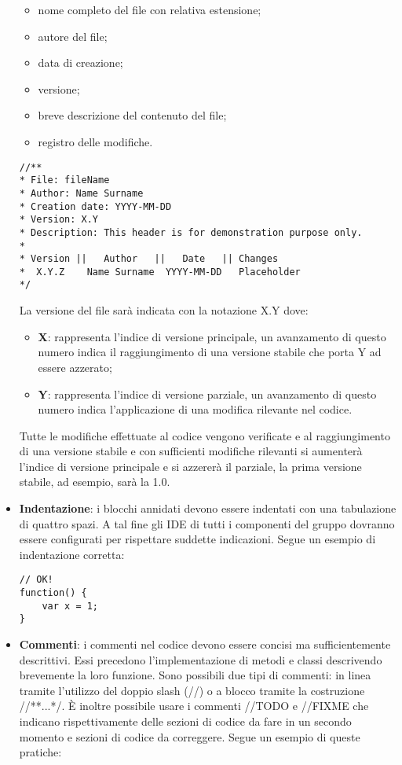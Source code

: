 \begin{itemize}
	\begin{itemize}
		\item nome completo del file con relativa estensione;
		\item autore del file;
		\item data di creazione;
		\item versione;
		\item breve descrizione del contenuto del file;
		\item registro delle modifiche.
	\end{itemize}
\begin{lstlisting}
//**
* File: fileName
* Author: Name Surname
* Creation date: YYYY-MM-DD
* Version: X.Y
* Description: This header is for demonstration purpose only.
*
* Version ||   Author   ||   Date   || Changes
*  X.Y.Z    Name Surname  YYYY-MM-DD   Placeholder
*/
\end{lstlisting}
	La versione del file sarà indicata con la notazione X.Y dove:
	\begin{itemize}
		\item \textbf{X}: rappresenta l'indice di versione principale, un avanzamento di questo numero indica il raggiungimento di una versione stabile che porta Y ad essere azzerato;
		\item \textbf{Y}: rappresenta l'indice di versione parziale, un avanzamento di questo numero indica l'applicazione di una modifica rilevante nel codice.
	\end{itemize}
	Tutte le modifiche effettuate al codice vengono verificate e al raggiungimento di una versione stabile e con sufficienti modifiche rilevanti si aumenterà l'indice di versione principale e si azzererà il parziale, la prima versione stabile, ad esempio, sarà la 1.0.
	\item \textbf{Indentazione}: i blocchi annidati devono essere indentati con una tabulazione di quattro spazi. A tal fine gli IDE di tutti i componenti del gruppo dovranno essere configurati per rispettare suddette indicazioni. Segue un esempio di indentazione corretta:
\begin{lstlisting}
// OK!
function() {
	var x = 1;
}
\end{lstlisting}
	\item \textbf{Commenti}: i commenti nel codice devono essere concisi ma sufficientemente descrittivi. Essi precedono l'implementazione di metodi e classi descrivendo brevemente la loro funzione. Sono possibili due tipi di commenti: in linea tramite l'utilizzo del doppio slash (//) o a blocco tramite la costruzione //**...*/.  È inoltre possibile usare i commenti //TODO e //FIXME che indicano rispettivamente delle sezioni di codice da fare in un secondo momento e sezioni di codice da correggere. Segue un esempio di queste pratiche:

\end{itemize}
